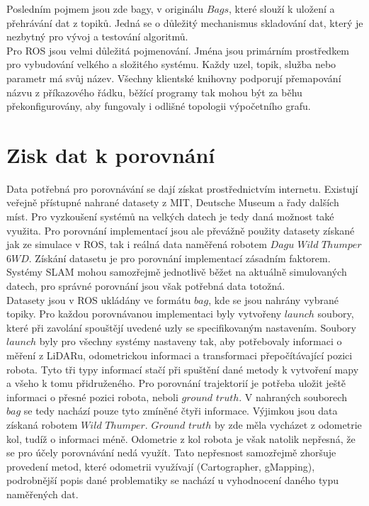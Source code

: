 \documentclass[12pt]{report}
\begin{document}
\indent Posledním pojmem jsou zde bagy, v originálu $Bags$, které slouží k uložení a přehrávání dat z topiků. Jedná se o důležitý mechanismus skladování dat, který je nezbytný pro vývoj a testování algoritmů.\\
\indent Pro ROS jsou velmi důležitá pojmenování. Jména jsou primárním prostředkem pro vybudování velkého a složitého systému. Každy uzel, topik, služba nebo parametr má svůj název. Všechny klientské knihovny podporují přemapování názvu z příkazového řádku, běžící programy tak mohou být za běhu překonfigurovány, aby fungovaly i odlišné topologii výpočetního grafu.\\

\newpage

\section{Zisk dat k porovnání}
Data potřebná pro porovnávání se dají získat prostřednictvím internetu. Existují veřejně přístupné nahrané datasety z MIT, Deutsche Museum a řady dalších míst. Pro vyzkoušení systémů na velkých datech je tedy daná možnost také využita. Pro porovnání implementací jsou ale převážně použity datasety získané jak ze simulace v ROS, tak i reálná data naměřená robotem $Dagu$ $Wild$ $Thumper$ $6WD$. Získání datasetu je pro porovnání implementací zásadním faktorem. Systémy SLAM mohou samozřejmě jednotlivě běžet na aktuálně simulovaných datech, pro správné porovnání jsou však potřebná data totožná.\\ 
\indent Datasety jsou v ROS ukládány ve formátu $bag$, kde se jsou nahrány vybrané topiky. Pro každou porovnávanou implementaci byly vytvořeny $launch$ soubory, které při zavolání spouštějí uvedené uzly se specifikovaným nastavením. Soubory $launch$ byly pro všechny systémy nastaveny tak, aby potřebovaly informaci o měření z LiDARu, odometrickou informaci a transformaci přepočítávající pozici robota. Tyto tři typy informací stačí při spuštění dané metody k vytvoření mapy a všeho k tomu přidruženého. Pro porovnání trajektorií je potřeba uložit ještě informaci o přesné pozici robota, neboli $ground$ $truth$. V nahraných souborech $bag$ se tedy nachází pouze tyto zmíněné čtyři informace. Výjimkou jsou data získaná robotem $Wild$ $Thumper$. $Ground$ $truth$ by zde měla vycházet z odometrie kol, tudíž o informaci méně. Odometrie z kol robota je však natolik nepřesná, že se pro účely porovnávání nedá využít. Tato nepřesnost samozřejmě zhoršuje provedení metod, které odometrii využívají (Cartographer, gMapping), podrobnější popis dané problematiky se nachází u vyhodnocení daného typu naměřených dat.\\
\end{document}
